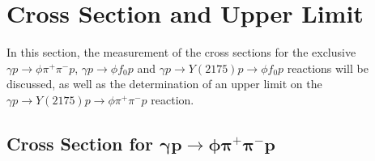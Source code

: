 \begin{comment}
\par In the following we will try to subtract the background underneath the $\phi$ peak. Due to the asymmetry of the background shape on the sides of the $\phi$ peak, the simple side band subtraction will not be appropriate, because it could include an over- or underestimation of the background events.\\
An efficient method will be to study the $K^+K^-$ and $\pi^+\pi^-$ or $\phi \pi^+ \pi^-$ correlations. As an example we will apply the technique on the $\pi^+\pi^-$ invariant mass. The $K^+K^-$ and $\pi^+\pi^-$ correlation is shown on Fig.~\ref{fig.4.4.2}a, we notice the horizontal and vertical bands of the $\phi$(1020) and $\rho$(770) respectively. We project every bin of the $K^+K^-$ invariant mass shown in Fig.~\ref{fig.4.4.2}b, we describe the signal and background shapes, the signal fit parameters used are extracted from the corresponding MC sample. Finally, we look at $\pi^+\pi^-$ invariant mass for the events that contain the $\phi$(1020) signal only. The extracted $\phi$(1020) signal yield (N$_{\phi}$) as a function of the $\pi^+\pi^-$ invariant mass is shown in Fig.~\ref{fig.4.4.2}c, where a small enhancement around 980 GeV/c$^2$ is seen, a detail study of this enhancement will discussed in sections \ref{p.4.5.3} and \ref{p.4.5.4}.

\begin{figure}[H]
    \centering
    \texttt{[image: plots/phi\_scan.png]}
    \caption{\label{fig.4.4.2}$K^+K^-$ versus $\pi^+\pi^-$ invariant mass (a), $K^+K^-$ invariant mass projection in $\pi^+\pi^-$ bins (b) and $\pi^+\pi^-$ $\phi$-mass dependent invariant mass (c).}
\end{figure}

\end{comment}

\section{Cross Section and Upper Limit}
\label{chap.y2175.xsec_ul}

In this section, the measurement of the cross sections for the exclusive $\gamma p \rightarrow \phi \pi^+ \pi^- p$, $\gamma p \rightarrow \phi f_0 p$ and $\gamma p \rightarrow Y(2175) p \rightarrow \phi f_0 p$ reactions will be discussed, as well as the determination of an upper limit on the $\gamma p \rightarrow Y(2175) p \rightarrow \phi \pi^+ \pi^- p$ reaction.

\subsection{Cross Section for \texorpdfstring{$\bm{\gamma p \rightarrow \phi \pi^{+} \pi^{-} p}$}{} }
\label{chap.y2175.xsec_ul.phi2pi}

